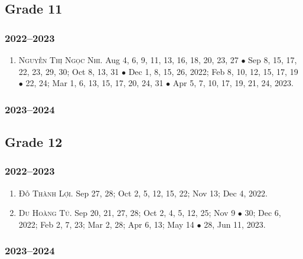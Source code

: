 \documentclass{article}
\begin{document}
\subsection{Grade 11}

\subsubsection{2022--2023}

\begin{enumerate}
	\item \textsc{Nguyễn Thị Ngọc Nhi.} {\sf[In]} Aug 4, 6, 9, 11, 13, 16, 18, 20, 23, 27 $\bullet$ Sep 8, 15, 17, 22, 23, 29, 30; Oct 8, 13, 31 $\bullet$ Dec 1, 8,  15, 26, 2022; Feb 8, 10, 12, 15, 17, 19 $\bullet$ 22, 24; Mar 1, 6, 13, 15, 17, 20, 24, 31 $\bullet$ Apr 5, 7, 10, 17, 19, 21, 24, 2023.
\end{enumerate}

\subsubsection{2023--2024}


\subsection{Grade 12}

\subsubsection{2022--2023}

\begin{enumerate}
	\item \textsc{Đỗ Thành Lợi.} {\sf[In]} Sep 27, 28; Oct 2, 5, 12, 15, 22; Nov 13; Dec 4, 2022. {\sf[Out]}
	\item \textsc{Du Hoàng Tú.} {\sf[In]} Sep 20, 21, 27, 28; Oct 2, 4, 5, 12, 25; Nov 9 $\bullet$ 30; Dec 6, 2022; Feb 2, 7, 23; Mar 2, 28; Apr 6, 13; May 14 $\bullet$ 28, Jun 11, 2023. {\sf[Out]}
\end{enumerate}

\subsubsection{2023--2024}

\end{document}
